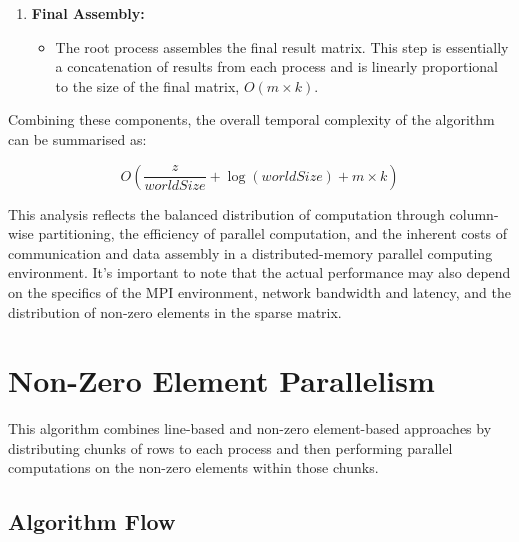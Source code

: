 \documentclass[12pt,oneside]{book} %
\begin{document}
\begin{enumerate}
    \item \textbf{Final Assembly:}
          \begin{itemize}
              \item The root process assembles the final result matrix. This step is essentially a
                    concatenation of results from each process and is linearly proportional to the
                    size of the final matrix, \( O(m \times k) \).
          \end{itemize}
\end{enumerate}
Combining these components, the overall temporal complexity of the algorithm can be summarised as:

\[ O\left(\frac{z}{worldSize} + \log(worldSize) + m \times k\right) \]

This analysis reflects the balanced distribution of computation through
column-wise partitioning, the efficiency of parallel computation, and the
inherent costs of communication and data assembly in a distributed-memory
parallel computing environment. It's important to note that the actual
performance may also depend on the specifics of the MPI environment, network
bandwidth and latency, and the distribution of non-zero elements in the sparse
matrix.

\newpage
\section{Non-Zero Element Parallelism}
This algorithm combines line-based and non-zero element-based approaches by
distributing chunks of rows to each process and then performing parallel
computations on the non-zero elements within those chunks.

\subsection{Algorithm Flow}
\end{document}
